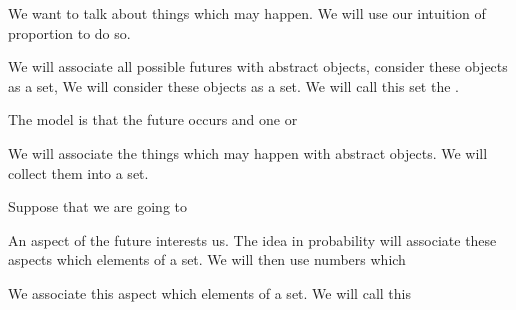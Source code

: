 
\sbasic


\sstart
{}


We want to talk about
things which may happen.
We will use our intuition
of proportion to do so.


We will associate all possible
futures with abstract objects,
consider these objects as a set,
We will consider these
objects as a set.
We will call this set
the .

The model is that the future
occurs and one or

We will associate the
things which may happen
with abstract objects.
We will collect them
into a set.

Suppose that we are going to

An aspect of the future
interests us. The idea
in probability will associate
these aspects which elements
of a set.
We will then use numbers which

We associate
this aspect which elements
of a set.
We will call this
\strats
